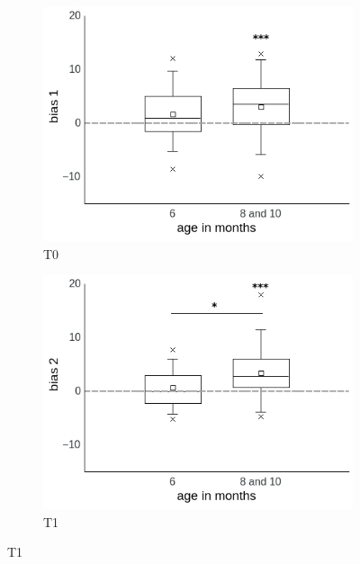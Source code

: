 \documentclass[a4paper]{scrreprt}
\begin{document}
\begin{figure}
\centering
    \begin{subfigure}[b]{0.49\textwidth}
        \includegraphics[width=\textwidth]{figs/sec3/age/age2_diff1_mod2.jpeg}
        \caption{T0}
    \end{subfigure}
\begin{subfigure}[b]{0.49\textwidth}
        \includegraphics[width=\textwidth]{figs/sec3/age/age2_diff2_mod2.jpeg}
        \caption{T1}
    \end{subfigure}
    

\end{figure}
\end{document}
